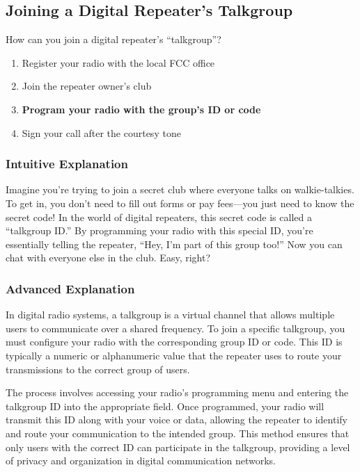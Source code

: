 \subsection{Joining a Digital Repeater’s Talkgroup}
\label{T2B07}

\begin{tcolorbox}[colback=gray!10!white,colframe=black!75!black,title=T2B07]
How can you join a digital repeater’s “talkgroup”?
\begin{enumerate}[label=\Alph*)]
    \item Register your radio with the local FCC office
    \item Join the repeater owner’s club
    \item \textbf{Program your radio with the group’s ID or code}
    \item Sign your call after the courtesy tone
\end{enumerate}
\end{tcolorbox}

\subsubsection{Intuitive Explanation}
Imagine you’re trying to join a secret club where everyone talks on walkie-talkies. To get in, you don’t need to fill out forms or pay fees—you just need to know the secret code! In the world of digital repeaters, this secret code is called a “talkgroup ID.” By programming your radio with this special ID, you’re essentially telling the repeater, “Hey, I’m part of this group too!” Now you can chat with everyone else in the club. Easy, right?

\subsubsection{Advanced Explanation}
In digital radio systems, a talkgroup is a virtual channel that allows multiple users to communicate over a shared frequency. To join a specific talkgroup, you must configure your radio with the corresponding group ID or code. This ID is typically a numeric or alphanumeric value that the repeater uses to route your transmissions to the correct group of users.

The process involves accessing your radio’s programming menu and entering the talkgroup ID into the appropriate field. Once programmed, your radio will transmit this ID along with your voice or data, allowing the repeater to identify and route your communication to the intended group. This method ensures that only users with the correct ID can participate in the talkgroup, providing a level of privacy and organization in digital communication networks.

